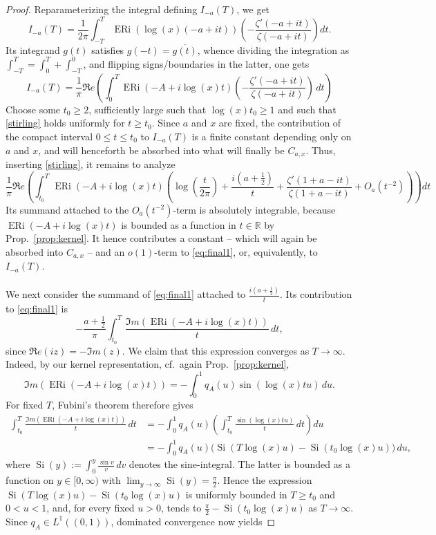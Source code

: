 \documentclass[a4paper,10pt]{amsart}
\DeclareMathOperator{\ERi}{ERi}
\theoremstyle{definition}
\numberwithin{equation}{section}
\def\R{\mathbb R}
\begin{document}
\begin{proof}
Reparameterizing the integral defining $I_{-a}(T)$, we get
$$
I_{-a}(T) = \frac1{2\pi}\int_{-T}^T\ERi(\log(x)(-a+it))\left(-\frac{\zeta'(-a+it)}{\zeta(-a+it)}\right)dt.
$$
Its integrand $g(t)$ satisfies $g(-t)=\overline{g(t)}$, whence dividing the integration as $\int_{-T}^T=\int_{0}^T+\int_{-T}^0$, and flipping signs/boundaries in the latter, one gets
$$
I_{-a}(T) = \frac1\pi \Re e\left(\int_0^T \ERi(-A+i\log(x)t) \left(-\frac{\zeta'(-a+it)}{\zeta(-a+it)}\right)\,dt\right)
$$
Choose some $t_0\ge2$, sufficiently large such that $\log(x)t_0\geq 1$ and such that \eqref{stirling} holds uniformly for $t\ge t_0$. Since $a$ and $x$ are fixed, the contribution of the compact interval $0\le t\le t_0$ to $I_{-a}(T)$ is a finite constant depending only on $a$ and $x$, and will henceforth be absorbed into what will finally be $C_{a,x}$. Thus, inserting \eqref{stirling}, it remains to analyze
\begin{equation}\label{eq:final1} 
\frac1\pi \Re e\left(\int_{t_0}^T \ERi(-A+i\log(x)t) \left(\log\left(\frac{t}{2\pi}\right) +\frac{i(a+\tfrac12)}t +\frac{\zeta'(1+a-it)}{\zeta(1+a-it)} +O_a(t^{-2})\right)\right)dt
\end{equation}
Its summand attached to the $O_a(t^{-2})$-term is absolutely integrable, because $\ERi(-A+i\log(x)t)$ is bounded as a function in $t\in\R$ by Prop.\ \ref{prop:kernel}. It hence contributes a constant -- which will again be absorbed into $C_{a,x}$ -- and an $o(1)$-term to \eqref{eq:final1}, or, equivalently, to $I_{-a}(T)$.\\\\ 
We next consider the summand of \eqref{eq:final1} attached to $\frac{i(a+\tfrac12)}{t}$. Its contribution to \eqref{eq:final1} is
$$
-\frac{a+\tfrac12}{\pi} \int_{t_0}^T \frac{\Im m(\ERi(-A+i\log(x)t))}{t}\,dt,
$$
since $\Re e(iz)=-\Im m(z)$. We claim that this expression converges as $T\to\infty$. Indeed, by our kernel representation, cf.\ again Prop.\ \ref{prop:kernel}, 
$$
\Im m(\ERi(-A+i\log(x)t)) = -\int_0^1q_A(u)\sin(\log(x)tu)\,du.
$$
For fixed $T$, Fubini's theorem therefore gives
$$
\begin{aligned}
\int_{t_0}^T\frac{\Im m(\ERi(-A+i\log(x)t))}{t}\,dt
&=-\int_0^1q_A(u)\left(\int_{t_0}^T\frac{\sin(\log(x)tu)}t\,dt\right)du\\
&=-\int_0^1q_A(u)\bigl(\operatorname{Si}(T\log(x)u)-\operatorname{Si}(t_0\log(x)u)\bigr)\,du,
\end{aligned}
$$
where $\operatorname{Si}(y):=\int_0^y\frac{\sin v}{v}\,dv$ denotes the sine-integral. The latter is bounded as a function on $y\in [0,\infty)$ with $\lim_{y\to\infty}\operatorname{Si}(y)=\tfrac{\pi}{2}.$ Hence the expression $\operatorname{Si}(T\log(x)u)-\operatorname{Si}(t_0\log(x)u)$ is uniformly bounded in $T\ge t_0$ and $0<u<1$, and, for every fixed $u>0$, tends to $\frac{\pi}{2}-\operatorname{Si}(t_0\log(x)u)$ as $T\to\infty$. Since $q_A\in L^1((0,1))$, dominated convergence now yields

\end{proof}
\end{document}
